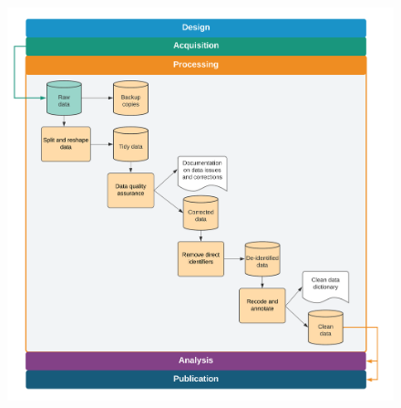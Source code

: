 \begin{fullwidth}
	\begin{figure}
		\centering
		\includegraphics[width=1.6\linewidth]{diagrams/Cleaning}
		\label{fig:cleaning}
	\end{figure}
\end{fullwidth}

